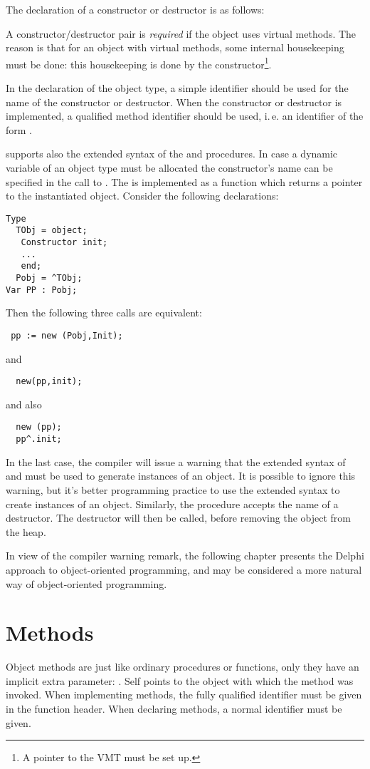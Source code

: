 The declaration of a constructor or destructor is as follows:

A constructor/destructor pair is {\em required} if the object uses virtual methods.
The reason is that for an object with virtual methods, some internal
housekeeping must be done: this housekeeping is done by the
constructor\footnote{A pointer to the VMT must be set up.}.

In the declaration of the object type, a simple identifier should be used
for the name of the constructor or destructor. When the constructor or destructor
is implemented, a qualified method identifier should be used,
i.\,e. an identifier of the form .

\fpc supports also the extended syntax of the  and 
procedures. In case a dynamic variable of an object type must be allocated
the constructor's name can be specified in the call to .
The  is implemented as a function which returns a pointer to the
instantiated object. Consider the following declarations:
\begin{verbatim}
Type
  TObj = object;
   Constructor init;
   ...
   end;
  Pobj = ^TObj;
Var PP : Pobj;
\end{verbatim}
Then the following three calls are equivalent:
\begin{verbatim}
 pp := new (Pobj,Init);
\end{verbatim}
and
\begin{verbatim}
  new(pp,init);
\end{verbatim}
and also
\begin{verbatim}
  new (pp);
  pp^.init;
\end{verbatim}
In the last case, the compiler will issue a warning that the
extended syntax of  and  must be used to generate instances of an
object. It is possible to ignore this warning, but it's better programming practice to
use the extended syntax to create instances of an object.
Similarly, the  procedure accepts the name of a destructor. The
destructor will then be called, before removing the object from the heap.

In view of the compiler warning remark, the following chapter presents the
Delphi approach to object-oriented programming, and may be considered a
more natural way of object-oriented programming.

\section{Methods}
Object methods are just like ordinary procedures or functions, only they
have an implicit extra parameter: . Self points to the object
with which the method was invoked.
When implementing methods, the fully qualified identifier must be given
in the function header. When declaring methods, a normal identifier must be
given.

